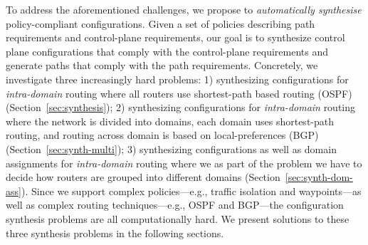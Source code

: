 To address the aforementioned challenges, we propose
to 
\emph{automatically synthesise} policy-compliant configurations.
Given a set of policies describing path requirements
and control-plane requirements, our goal is to synthesize
control plane configurations that comply with the control-plane
requirements and generate paths that comply with the path requirements.
Concretely, we investigate three increasingly hard problems:
1) synthesizing configurations for \emph{intra-domain} routing where all routers
use shortest-path based routing (OSPF) (Section~\ref{sec:synthesis});
2) synthesizing configurations for \emph{intra-domain} routing where the network is 
divided into domains, each domain uses shortest-path routing, and routing across domain
is based on local-preferences (BGP) (Section~\ref{sec:synth-multi});
3) synthesizing configurations as well as domain assignments for \emph{intra-domain} routing where 
we as part of the problem we have to decide how routers are grouped into different domains (Section~\ref{sec:synth-dom-ass}).
Since we support complex policies---e.g.,  traffic isolation and 
waypoints---as well as
complex routing techniques---e.g., OSPF and BGP---the configuration
synthesis problems are all computationally hard.
We present solutions to these three synthesis problems in the following sections.







